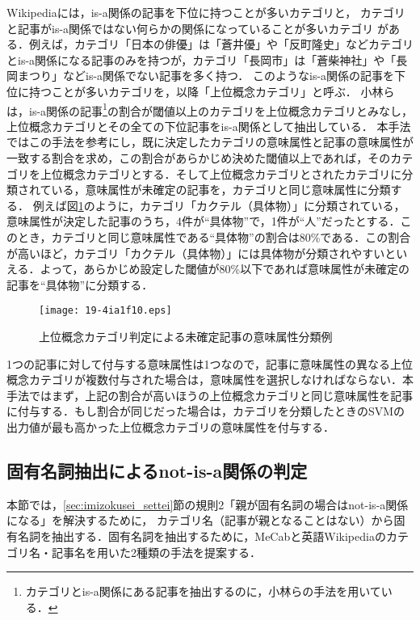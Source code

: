 \documentclass[japanese]{jnlp_1.4}
\begin{document}
Wikipediaには，is-a関係の記事を下位に持つことが多いカテゴリと，
カテゴリと記事がis-a関係ではない何らかの関係になっていることが多いカテゴリ
がある．例えば，カテゴリ「日本の俳優」は「蒼井優」や「反町隆史」などカテゴリとis-a関係になる記事のみを持つが，カテゴリ「長岡市」は「蒼柴神社」や「長岡まつり」などis-a関係でない記事を多く持つ．
このようなis-a関係の記事を下位に持つことが多いカテゴリを，以降「上位概念カテゴリ」と呼ぶ．
小林ら\citeyear{Kobayashi2}は，is-a関係の記事\footnote{カテゴリとis-a関係にある記事を抽出するのに，小林ら\citeyear{Kobayashi}の手法を用いている．}の割合が閾値以上のカテゴリを上位概念カテゴリとみなし，上位概念カテゴリとその全ての下位記事をis-a関係として抽出している．
本手法ではこの手法を参考にし，既に決定したカテゴリの意味属性と記事の意味属性が一致する割合を求め，この割合があらかじめ決めた閾値以上であれば，そのカテゴリを上位概念カテゴリとする．そして上位概念カテゴリとされたカテゴリに分類されている，意味属性が未確定の記事を，カテゴリと同じ意味属性に分類する．
例えば図\ref{fig:mibunrui_kizi}のように，カテゴリ「カクテル（具体物）」に分類されている，意味属性が決定した記事のうち，4件が``具体物''で，1件が``人''だったとする．このとき，カテゴリと同じ意味属性である``具体物''の割合は80\%である．この割合が高いほど，カテゴリ「カクテル（具体物）」には具体物が分類されやすいといえる．よって，あらかじめ設定した閾値が80\%以下であれば意味属性が未確定の記事を``具体物''に分類する．

\begin{figure}[t]
\begin{center}
\texttt{[image: 19-4ia1f10.eps]}
\end{center}
\caption{上位概念カテゴリ判定による未確定記事の意味属性分類例}
\label{fig:mibunrui_kizi}
\end{figure}

1つの記事に対して付与する意味属性は1つなので，記事に意味属性の異なる上位概念カテゴリが複数付与された場合は，意味属性を選択しなければならない．本手法ではまず，上記の割合が高いほうの上位概念カテゴリと同じ意味属性を記事に付与する．もし割合が同じだった場合は，カテゴリを分類したときのSVMの出力値が最も高かった上位概念カテゴリの意味属性を付与する．


\subsection{固有名詞抽出によるnot-is-a関係の判定}
\label{sec:koyu_hantei}

本節では，\ref{sec:imizokusei_settei}節の規則2「親が固有名詞の場合はnot-is-a関係になる」を解決するために，
カテゴリ名（記事が親となることはない）から固有名詞を抽出する．固有名詞を抽出するために，MeCabと英語Wikipediaのカテゴリ名・記事名を用いた2種類の手法を提案する．
\end{document}
